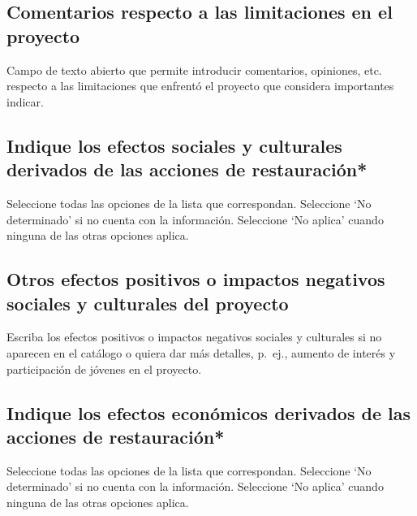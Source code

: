 \documentclass[
]{book}
\begin{document}
\hypertarget{comentarios-respecto-a-las-limitaciones-en-el-proyecto}{%
\subsection{Comentarios respecto a las limitaciones en el proyecto}\label{comentarios-respecto-a-las-limitaciones-en-el-proyecto}}

Campo de texto abierto que permite introducir comentarios, opiniones, etc. respecto a las limitaciones que enfrentó el proyecto que considera importantes indicar.

\hypertarget{indique-los-efectos-sociales-y-culturales-derivados-de-las-acciones-de-restauraciuxf3n}{%
\subsection{Indique los efectos sociales y culturales derivados de las acciones de restauración*}\label{indique-los-efectos-sociales-y-culturales-derivados-de-las-acciones-de-restauraciuxf3n}}

Seleccione todas las opciones de la lista que correspondan.
Seleccione `No determinado' si no cuenta con la información.
Seleccione `No aplica' cuando ninguna de las otras opciones aplica.

\hypertarget{otros-efectos-positivos-o-impactos-negativos-sociales-y-culturales-del-proyecto}{%
\subsection{Otros efectos positivos o impactos negativos sociales y culturales del proyecto}\label{otros-efectos-positivos-o-impactos-negativos-sociales-y-culturales-del-proyecto}}

Escriba los efectos positivos o impactos negativos sociales y culturales si no aparecen en el catálogo o quiera dar más detalles, p.~ej., aumento de interés y participación de jóvenes en el proyecto.

\hypertarget{indique-los-efectos-econuxf3micos-derivados-de-las-acciones-de-restauraciuxf3n}{%
\subsection{Indique los efectos económicos derivados de las acciones de restauración*}\label{indique-los-efectos-econuxf3micos-derivados-de-las-acciones-de-restauraciuxf3n}}

Seleccione todas las opciones de la lista que correspondan.
Seleccione `No determinado' si no cuenta con la información.
Seleccione `No aplica' cuando ninguna de las otras opciones aplica.
\end{document}
